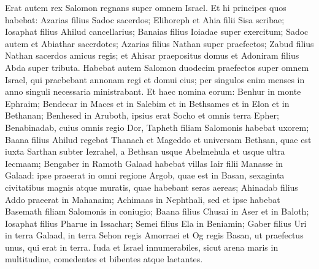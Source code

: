 \begin{biblechapter}
\begin{biblechapter}
\begin{biblechapter}
\begin{biblechapter}
\verse Erat autem rex Salomon regnans super omnem Israel. 
\verse Et hi principes quos habebat: Azarias filius Sadoc sacerdos; 
\verse Elihoreph et Ahia filii Sisa scribae; Iosaphat filius Ahilud cancellarius; 
\verse Banaias filius Ioiadae super exercitum; Sadoc autem et Abiathar sacerdotes; 
\verse Azarias filius Nathan super praefectos; Zabud filius Nathan sacerdos amicus regis; 
\verse et Ahisar praepositus domus et Adoniram filius Abda super tributa.
 \verse Habebat autem Salomon duodecim praefectos super omnem Israel, qui praebebant annonam regi et domui eius; per singulos enim menses in anno singuli necessaria ministrabant. 
\verse Et haec nomina eorum: Benhur in monte Ephraim; 
\verse Bendecar in Maces et in Salebim et in Bethsames et in Elon et in Bethanan; 
 \verse Benhesed in Aruboth, ipsius erat Socho et omnis terra Epher; 
\verse Benabinadab, cuius omnis regio Dor, Tapheth filiam Salomonis habebat uxorem; 
 \verse Baana filius Ahilud regebat Thanach et Mageddo et universam Bethsan, quae est iuxta Sarthan subter Iezrahel, a Bethsan usque Abelmehula et usque ultra Iecmaam; 
\verse Bengaber in Ramoth Galaad habebat villas Iair filii Manasse in Galaad: ipse praeerat in omni regione Argob, quae est in Basan, sexaginta civitatibus magnis atque muratis, quae habebant seras aereas; 
\verse Ahinadab filius Addo praeerat in Mahanaim; 
\verse Achimaas in Nephthali, sed et ipse habebat Basemath filiam Salomonis in coniugio; 
\verse Baana filius Chusai in Aser et in Baloth; 
\verse Iosaphat filius Pharue in Issachar; 
\verse Semei filius Ela in Beniamin; 
\verse Gaber filius Uri in terra Galaad, in terra Sehon regis Amorraei et Og regis Basan, ut praefectus unus, qui erat in terra.
 \verse Iuda et Israel innumerabiles, sicut arena maris in multitudine, comedentes et bibentes atque laetantes.
 

\end{biblechapter}
\end{biblechapter}
\end{biblechapter}
\end{biblechapter}
